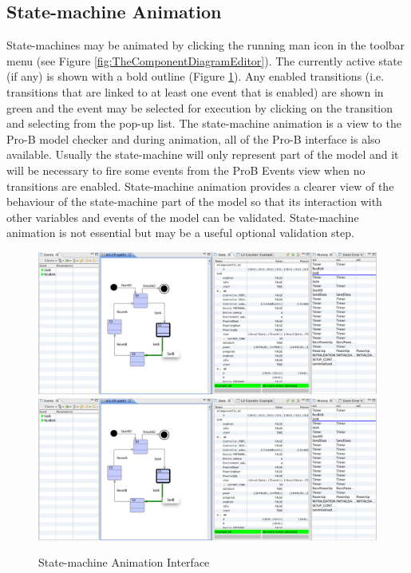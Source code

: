 \subsection{State-machine Animation}


State-machines may be animated by clicking the running man icon in the toolbar menu (see Figure \ref{fig:TheComponentDiagramEditor}). The currently active state (if any) is shown with a bold outline (Figure \ref{fig:StatemachineAnimationInterface}). Any enabled transitions (i.e. transitions that are linked to at least one event that is enabled) are shown in green and the event may be selected for execution by clicking on the transition and selecting from the pop-up list. The state-machine animation is a view to the Pro-B model checker and during animation, all of the Pro-B interface is also available. Usually the state-machine will only represent part of the model and it will be necessary to fire some events from the ProB Events view when no transitions are enabled. State-machine animation provides a clearer view of the behaviour of the state-machine part of the model so that its interaction with other variables and events of the model can be validated. State-machine animation is not essential but may be a useful optional validation step.
 
 \begin{figure}[!htbp]
  \centering
  \ifplastex
  \includegraphics[width=1024]{figures/image10.png}
  \else
  \includegraphics[width=1.0\textwidth]{figures/image10.png}
  \fi
  \caption{State-machine Animation Interface}
  \label{fig:StatemachineAnimationInterface}
\end{figure}


